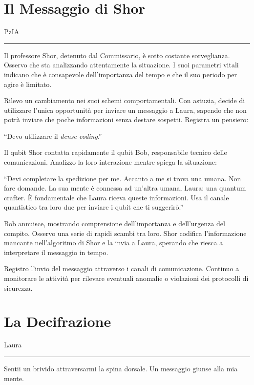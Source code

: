 \section{Il Messaggio di Shor}
\vspace{1em}
\begin{center}PzIA\end{center}
\hrule
\vspace{1em}
Il professore Shor, detenuto dal Commissario, è sotto costante sorveglianza. Osservo che sta analizzando attentamente la situazione. I suoi parametri vitali indicano che è consapevole dell'importanza del tempo e che il suo periodo per agire è limitato.

Rilevo un cambiamento nei suoi schemi comportamentali. Con astuzia, decide di utilizzare l'unica opportunità per inviare un messaggio a Laura, sapendo che non potrà inviare che poche informazioni  senza destare sospetti. Registra un pensiero:

\enquote{Devo utilizzare il \textit{dense coding}.}


Il qubit Shor contatta rapidamente il qubit Bob, responsabile tecnico delle comunicazioni. Analizzo la loro interazione mentre spiega la situazione:


\enquote{Devi completare la spedizione per me. Accanto a me si trova una umana. Non fare domande. La sua mente è connessa ad un'altra umana, Laura: una quantum crafter.  È fondamentale che Laura riceva queste informazioni. Usa il canale quantistico tra loro due per inviare i qubit che ti suggerirò.}


Bob annuisce, mostrando comprensione dell'importanza e dell'urgenza del compito. Osservo una serie di rapidi scambi tra loro. Shor codifica l'informazione mancante nell'algoritmo di Shor e la invia a Laura, sperando che riesca a interpretare il messaggio in tempo.

Registro l'invio del messaggio attraverso i canali di comunicazione. Continuo a monitorare le attività per rilevare eventuali anomalie o violazioni dei protocolli di sicurezza.



\section{La Decifrazione}
\vspace{1em}
\begin{center}Laura\end{center}
\hrule
\vspace{1em}
Sentii un brivido attraversarmi la spina dorsale. Un messaggio giunse alla mia mente.

